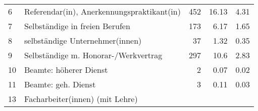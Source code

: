 \begin{longtable}{lXrrr}
     6 &
     \multicolumn{1}{X}{ Referendar(in), Anerkennungspraktikant(in)   } &


       \num{452} &
       \num[round-mode=places,round-precision=2]{16.13} &
         \num[round-mode=places,round-precision=2]{4.31} \\

     7 &
     \multicolumn{1}{X}{ Selbständige in freien Berufen   } &


       \num{173} &
       \num[round-mode=places,round-precision=2]{6.17} &
         \num[round-mode=places,round-precision=2]{1.65} \\

     8 &
     \multicolumn{1}{X}{ selbständige Unternehmer(innen)   } &


       \num{37} &
       \num[round-mode=places,round-precision=2]{1.32} &
         \num[round-mode=places,round-precision=2]{0.35} \\

     9 &
     \multicolumn{1}{X}{ Selbständige m. Honorar-/Werkvertrag   } &


       \num{297} &
       \num[round-mode=places,round-precision=2]{10.6} &
         \num[round-mode=places,round-precision=2]{2.83} \\

     10 &
     \multicolumn{1}{X}{ Beamte: höherer Dienst   } &


       \num{2} &
       \num[round-mode=places,round-precision=2]{0.07} &
         \num[round-mode=places,round-precision=2]{0.02} \\

     11 &
     \multicolumn{1}{X}{ Beamte: geh. Dienst   } &


       \num{3} &
       \num[round-mode=places,round-precision=2]{0.11} &
         \num[round-mode=places,round-precision=2]{0.03} \\

     13 &
     \multicolumn{1}{X}{ Facharbeiter(innen) (mit Lehre)   } &



\end{longtable}
